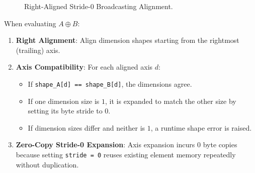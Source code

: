 \begin{figure}[h!]
\centering
{}
\caption{Right-Aligned Stride-0 Broadcasting Alignment.}
\label{fig:broadcasting_alignment}
\end{figure}

When evaluating $A \oplus B$:
\begin{enumerate}
    \item \textbf{Right Alignment}: Align dimension shapes starting from the rightmost (trailing) axis.
    \item \textbf{Axis Compatibility}: For each aligned axis $d$:
    \begin{itemize}
        \item If \texttt{shape\_A[d] == shape\_B[d]}, the dimensions agree.
        \item If one dimension size is $1$, it is expanded to match the other size by setting its byte stride to $0$.
        \item If dimension sizes differ and neither is $1$, a runtime shape error is raised.
    \end{itemize}
    \item \textbf{Zero-Copy Stride-0 Expansion}: Axis expansion incurs $0$ byte copies because setting \texttt{stride = 0} reuses existing element memory repeatedly without duplication.
\end{enumerate}

